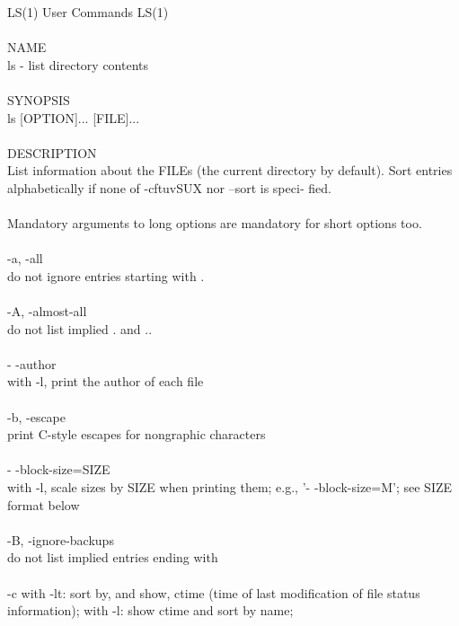 \documentclass{article}
\begin{document}
LS(1)                            User Commands                           LS(1) \\
\\
NAME \\
       ls - list directory contents \\
\\
SYNOPSIS \\
       ls [OPTION]... [FILE]... \\
\\
DESCRIPTION \\
\tabto{1cm}      List  information  about  the FILEs (the current directory by default).
\tabto{1cm}       Sort entries alphabetically if none of -cftuvSUX nor --sort  is  speci‐
\tabto{1cm}       fied. \\
\\
 \tabto{1cm}      Mandatory  arguments  to  long  options are mandatory for short options
       too. \\
\\
\tabto{1cm}       -a, \--all\\
\tabto{2cm}              do not ignore entries starting with .\\
\\
\tabto{1cm}       -A, \--almost-all\\
\tabto{2cm}              do not list implied . and .. \\
\\
 \tabto{1cm}      - -author \\
 \tabto{2cm}             with -l, print the author of each file \\
\\
\tabto{1cm}      -b, \--escape \\
\tabto{2cm}              print C-style escapes for nongraphic characters \\
\\
\tabto{1cm}       - -block-size=SIZE \\
\tabto{2cm}              with  -l,  scale  sizes  by  SIZE  when  printing  them;   e.g.,
\tabto{2cm}              '- -block-size=M'; see SIZE format below \\
\\
\tabto{1cm}       -B, \--ignore-backups \\
\tabto{2cm}              do not list implied entries ending with ~ \\
\\
\tabto{1cm}       -c     with -lt: sort by, and show, ctime (time of last modification of
\tabto{2cm}              file status information); with -l: show ctime and sort by  name;
\end{document}
